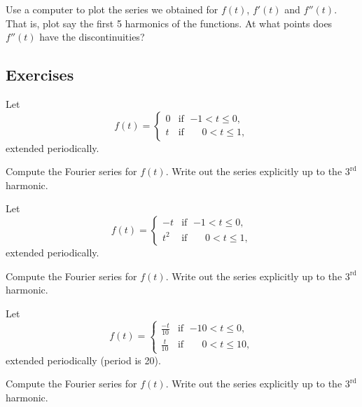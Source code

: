 \begin{exercise}
Use a computer to plot the series we obtained for $f(t)$, $f'(t)$ and
$f''(t)$.  That is, plot say the first 5 harmonics of the functions.  At what
points does $f''(t)$ have the discontinuities?
\end{exercise}

\subsection{Exercises}

\begin{exercise}
Let
\begin{equation*}
f(t) =
\begin{cases}
0 & \text{if } \; {-1} < t \leq 0 , \\
t & \text{if } \; \phantom{-}0 < t \leq  1 ,
\end{cases}
\end{equation*}
extended periodically.
\begin{tasks}
\task Compute the Fourier series for $f(t)$.
\task Write out the series explicitly up to the $3^{\text{rd}}$ harmonic.
\end{tasks}
\end{exercise}

\begin{exercise}
Let
\begin{equation*}
f(t) =
\begin{cases}
-t & \text{if } \; {-1} < t \leq 0 , \\
t^2 & \text{if } \; \phantom{-}0 < t \leq  1 ,
\end{cases}
\end{equation*}
extended periodically.
\begin{tasks}
\task Compute the Fourier series for $f(t)$.
\task Write out the series explicitly up to the $3^{\text{rd}}$ harmonic.
\end{tasks}
\end{exercise}

\begin{exercise}
Let
\begin{equation*}
f(t) =
\begin{cases}
\frac{-t}{10} & \text{if } \; {-10} < t \leq 0 , \\
\frac{t}{10} & \text{if } \; \phantom{-1}0 < t \leq  10 ,
\end{cases}
\end{equation*}
extended periodically (period is 20).
\begin{tasks}
\task Compute the Fourier series for $f(t)$.
\task Write out the series explicitly up to the $3^{\text{rd}}$ harmonic.
\end{tasks}
\end{exercise}

